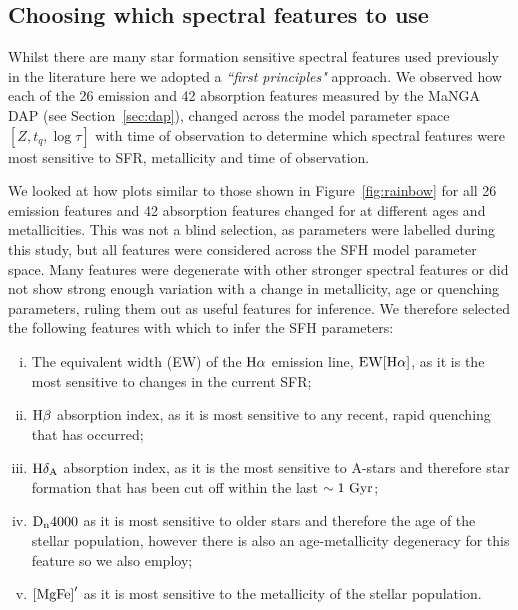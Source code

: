 \documentclass[useAMS,usenatbib]{mn2e}
\def\referee		{\color{refer}}
\begin{document}
\subsection{Choosing which spectral features to use}\label{sec:choosespf}

Whilst there are many star formation sensitive spectral features used previously in the literature \citep[see comprehensive review by][]{kennevans12} here we adopted a \emph{``first principles"} approach. We observed how each of the 26 emission and 42 absorption features measured by the MaNGA DAP (see Section~\ref{sec:dap}), changed across the model parameter space $[Z, t_q, \log \tau]$ with time of observation to determine which spectral features were most sensitive to SFR, metallicity and time of observation. 

We looked at how plots similar to those shown in Figure~\ref{fig:rainbow} for all 26 emission features and 42 absorption features changed for at different ages and metallicities. This was not a blind selection, as parameters were labelled during this study, but all features were considered across the SFH model parameter space. Many features were degenerate with other stronger spectral features or did not show strong enough variation with a change in metallicity, age or quenching parameters, ruling them out as useful features for inference. We therefore selected the following features with which to infer the SFH parameters:
\begin{enumerate}[(i)]
\item The equivalent width (EW) of the $\rm{H}\alpha$ emission line, $\rm{EW}[\rm{H}\alpha]$, as it is the most sensitive to {\referee changes} in the current SFR;


\item $\rm{H}\beta$ absorption index, as it is most sensitive to any recent, rapid quenching that has occurred;

\item $\rm{H}\delta_A$ absorption index, as it is the most sensitive to A-stars and therefore star formation that has been cut off within the last $\sim1~\rm{Gyr}$;

\item $\rm{D}_n4000$ as it is most sensitive to older stars and therefore the age of the stellar population, however there is also an age-metallicity degeneracy for this feature so we also employ;

\item $\rm{[MgFe]}^{\prime}$ as it is most sensitive to the metallicity of the stellar population.

\end{enumerate}
\end{document}
